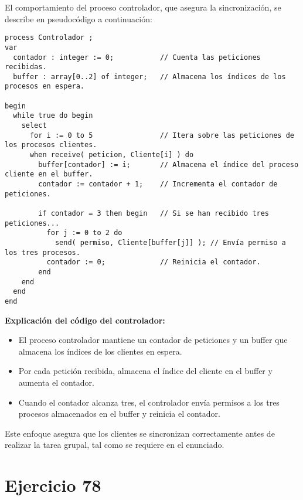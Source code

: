 \documentclass[a4paper,12pt]{article}
\begin{document}
El comportamiento del proceso controlador, que asegura la sincronización, se describe en pseudocódigo a continuación:

\begin{lstlisting}[style=customcpp, caption={Pseudocódigo del proceso Controlador}]
process Controlador ;
var
  contador : integer := 0;           // Cuenta las peticiones recibidas.
  buffer : array[0..2] of integer;   // Almacena los índices de los procesos en espera.

begin
  while true do begin
    select
      for i := 0 to 5                // Itera sobre las peticiones de los procesos clientes.
      when receive( peticion, Cliente[i] ) do
        buffer[contador] := i;       // Almacena el índice del proceso cliente en el buffer.
        contador := contador + 1;    // Incrementa el contador de peticiones.

        if contador = 3 then begin   // Si se han recibido tres peticiones...
          for j := 0 to 2 do
            send( permiso, Cliente[buffer[j]] ); // Envía permiso a los tres procesos.
          contador := 0;             // Reinicia el contador.
        end
    end
  end
end
\end{lstlisting}

\textbf{Explicación del código del controlador:}
\begin{itemize}
    \item El proceso controlador mantiene un contador de peticiones y un buffer que almacena los índices de los clientes en espera.
    \item Por cada petición recibida, almacena el índice del cliente en el buffer y aumenta el contador.
    \item Cuando el contador alcanza tres, el controlador envía permisos a los tres procesos almacenados en el buffer y reinicia el contador.
\end{itemize}

Este enfoque asegura que los clientes se sincronizan correctamente antes de realizar la tarea grupal, tal como se requiere en el enunciado.

\section{Ejercicio 78}
\end{document}
